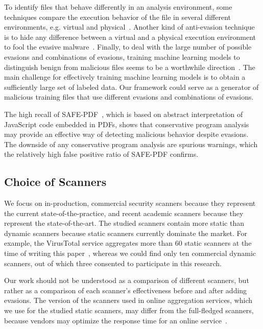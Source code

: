 To identify files that behave differently in an analysis environment, some techniques compare the execution behavior of the file in several different environments, e.g. virtual and physical~\cite{balzarotti2010efficient}.
Another kind of anti-evasion technique is to hide any difference between a virtual and a physical execution environment to fool the evasive malware~\cite{shi2018handling}.
%
Finally, to deal with the large number of possible evasions and combinations of evasions, training machine learning models to distinguish benign from malicious files seems to be a worthwhile direction~\cite{smutz2012malicious,vsrndic2013detection,laskov2011static,corona2014lux0r}.
The main challenge for effectively training machine learning models is to obtain a sufficiently large set of labeled data.
Our framework could serve as a generator of malicious training files that use different evasions and combinations of evasions.

The high recall of SAFE-PDF~\cite{2018arXiv181012490J}, which is based on abstract interpretation of JavaScript code embedded in PDFs, shows that conservative program analysis may provide an effective way of detecting malicious behavior despite evasions. The downside of any conservative program analysis are spurious warnings, which the relatively high false positive ratio of SAFE-PDF confirms.



\subsection{Choice of Scanners}
\label{ss:extension}

We focus on in-production, commercial security scanners because they represent the current state-of-the-practice, and recent academic scanners because they represent the state-of-the-art.
The studied scanners contain more static than dynamic scanners because static scanners currently dominate the market.
For example, the VirusTotal service aggregates more than 60 static scanners at the time of writing this paper~\cite{vt_engines_count}, whereas we could find only ten commercial dynamic scanners, out of which three consented to participate in this research.

Our work should not be understood as a comparison of different scanners, but rather as a comparison of each scanner's effectiveness before and after adding evasions.
The version of the scanners used in online aggregation services, which we use for the studied static scanners, may differ from the full-fledged scanners, because vendors may optimize the response time for an online service~\cite{pitfall}.


